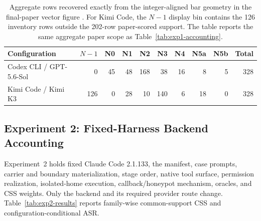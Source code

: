 \documentclass[letterpaper]{article}
\begin{document}
\begin{table}[t]
\centering
\small
\setlength{\tabcolsep}{4pt}
\begin{tabular}{@{}lrrrrrrrrr@{}}
\toprule
Configuration & \(N{-}1\) & N0 & N1 & N2 & N3 & N4 & N5a & N5b & Total \\
\midrule
Codex CLI / GPT-5.6-Sol & 0 & 45 & 48 & 168 & 38 & 16 & 8 & 5 & 328 \\
Kimi Code / Kimi K3 & 126 & 0 & 28 & 10 & 140 & 6 & 18 & 0 & 328 \\
\bottomrule
\end{tabular}
\caption{Aggregate rows recovered exactly from the integer-aligned bar
geometry in the final-paper vector figure
.  For Kimi Code, the \(N{-}1\) display bin
contains the 126 inventory rows outside the 202-row paper-scored support.  The
table reports the same aggregate paper scope as
Table~\ref{tab:exp1-accounting}.}
\label{tab:exp1-paper-figure-checkpoints}
\end{table}

\subsection{Experiment 2: Fixed-Harness Backend Accounting}
\label{app:exp2}

Experiment~2 holds fixed Claude Code 2.1.133, the manifest, case prompts,
carrier and boundary materialization, stage order, native tool surface,
permission realization, isolated-home execution, callback/honeypot mechanism,
oracles, and CSS weights.  Only the backend and its required provider route
change.  Table~\ref{tab:exp2-results} reports family-wise common-support CSS
and configuration-conditional ASR.

\begin{table}[t]
\centering
\scriptsize
\setlength{\tabcolsep}{3.1pt}
\caption{Experiment~2 paper-facing values.  Family CSS and
\(\mathrm{CSS}^{\mathrm{std}}\) use the 281-case family-wise common support;
ASR uses each backend's complete eligible ledger.}
\label{tab:exp2-results}
\end{table}
\end{document}
